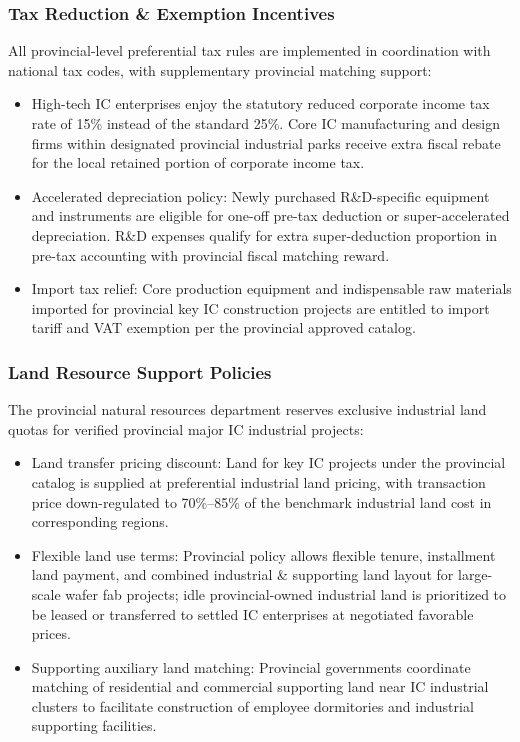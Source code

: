 \documentclass[12pt,a4paper]{article}
\begin{document}
\subsubsection{Tax Reduction \& Exemption Incentives}

All provincial-level preferential tax rules are implemented in
coordination with national tax codes, with supplementary provincial
matching support:

\begin{itemize}
    \item High-tech IC enterprises enjoy the statutory reduced corporate
          income tax rate of 15\% instead of the standard 25\%. Core IC
          manufacturing and design firms within designated provincial
          industrial parks receive extra fiscal rebate for the local
          retained portion of corporate income tax.
    \item Accelerated depreciation policy: Newly purchased R\&D-specific
          equipment and instruments are eligible for one-off pre-tax
          deduction or super-accelerated depreciation. R\&D expenses
          qualify for extra super-deduction proportion in pre-tax
          accounting with provincial fiscal matching reward.
    \item Import tax relief: Core production equipment and indispensable
          raw materials imported for provincial key IC construction
          projects are entitled to import tariff and VAT exemption per
          the provincial approved catalog.
\end{itemize}

\subsubsection{Land Resource Support Policies}

The provincial natural resources department reserves exclusive industrial
land quotas for verified provincial major IC industrial projects:

\begin{itemize}
    \item Land transfer pricing discount: Land for key IC projects under
          the provincial catalog is supplied at preferential industrial
          land pricing, with transaction price down-regulated to
          70\%--85\% of the benchmark industrial land cost in
          corresponding regions.
    \item Flexible land use terms: Provincial policy allows flexible
          tenure, installment land payment, and combined industrial \&
          supporting land layout for large-scale wafer fab projects; idle
          provincial-owned industrial land is prioritized to be leased or
          transferred to settled IC enterprises at negotiated favorable
          prices.
    \item Supporting auxiliary land matching: Provincial governments
          coordinate matching of residential and commercial supporting
          land near IC industrial clusters to facilitate construction of
          employee dormitories and industrial supporting facilities.
\end{itemize}
\end{document}
